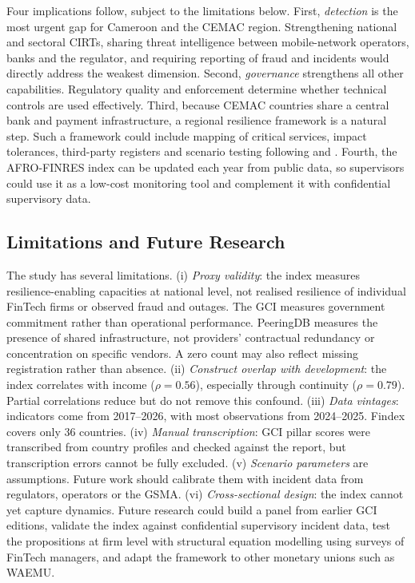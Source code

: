 \documentclass[fintech,article,submit,pdftex,moreauthors]{Definitions/mdpi}
\begin{document}
Four implications follow, subject to the limitations below. First, \emph{detection} is the most urgent gap for Cameroon and the CEMAC region. Strengthening national and sectoral CIRTs, sharing threat intelligence between mobile-network operators, banks and the regulator, and requiring reporting of fraud and incidents would directly address the weakest dimension. Second, \emph{governance} strengthens all other capabilities. Regulatory quality and enforcement determine whether technical controls are used effectively. Third, because CEMAC countries share a central bank and payment infrastructure, a regional resilience framework is a natural step. Such a framework could include mapping of critical services, impact tolerances, third-party registers and scenario testing following \citet{BCBS2021} and \citet{FSB2023}. Fourth, the AFRO-FINRES index can be updated each year from public data, so supervisors could use it as a low-cost monitoring tool and complement it with confidential supervisory data.

\subsection{Limitations and Future Research}

The study has several limitations. (i) \emph{Proxy validity}: the index measures resilience-enabling capacities at national level, not realised resilience of individual FinTech firms or observed fraud and outages. The GCI measures government commitment rather than operational performance. PeeringDB measures the presence of shared infrastructure, not providers' contractual redundancy or concentration on specific vendors. A zero count may also reflect missing registration rather than absence. (ii) \emph{Construct overlap with development}: the index correlates with income ($\rho=0.56$), especially through continuity ($\rho=0.79$). Partial correlations reduce but do not remove this confound. (iii) \emph{Data vintages}: indicators come from 2017--2026, with most observations from 2024--2025. Findex covers only 36 countries. (iv) \emph{Manual transcription}: GCI pillar scores were transcribed from country profiles and checked against the report, but transcription errors cannot be fully excluded. (v) \emph{Scenario parameters} are assumptions. Future work should calibrate them with incident data from regulators, operators or the GSMA. (vi) \emph{Cross-sectional design}: the index cannot yet capture dynamics. Future research could build a panel from earlier GCI editions, validate the index against confidential supervisory incident data, test the propositions at firm level with structural equation modelling using surveys of FinTech managers, and adapt the framework to other monetary unions such as WAEMU.
\end{document}

